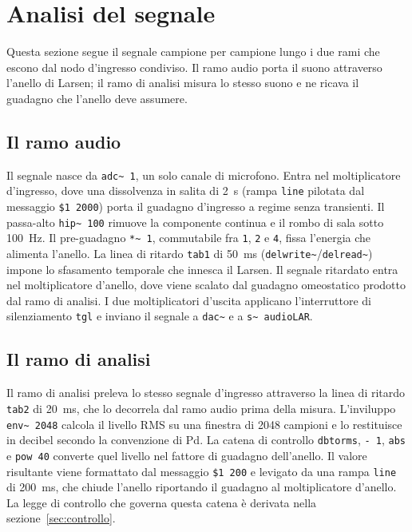 \documentclass[11pt,a4paper]{article}
\begin{document}
\section{Analisi del segnale}\label{sec:segnale}
Questa sezione segue il segnale campione per campione lungo i due rami che escono dal nodo d'ingresso condiviso.
Il ramo audio porta il suono attraverso l'anello di Larsen; il ramo di analisi misura lo stesso suono e ne ricava il guadagno che l'anello deve assumere.

\subsection{Il ramo audio}
Il segnale nasce da \texttt{adc\textasciitilde{} 1}, un solo canale di microfono.
Entra nel moltiplicatore d'ingresso, dove una dissolvenza in salita di \SI{2}{\second} (rampa \texttt{line} pilotata dal messaggio \texttt{\$1 2000}) porta il guadagno d'ingresso a regime senza transienti.
Il passa-alto \texttt{hip\textasciitilde{} 100} rimuove la componente continua e il rombo di sala sotto \SI{100}{\hertz}.
Il pre-guadagno \texttt{*\textasciitilde{} 1}, commutabile fra \texttt{1}, \texttt{2} e \texttt{4}, fissa l'energia che alimenta l'anello.
La linea di ritardo \texttt{tab1} di \SI{50}{\milli\second} (\texttt{delwrite\textasciitilde{}}/\texttt{delread\textasciitilde{}}) impone lo sfasamento temporale che innesca il Larsen.
Il segnale ritardato entra nel moltiplicatore d'anello, dove viene scalato dal guadagno omeostatico prodotto dal ramo di analisi.
I due moltiplicatori d'uscita applicano l'interruttore di silenziamento \texttt{tgl} e inviano il segnale a \texttt{dac\textasciitilde{}} e a \texttt{s\textasciitilde{} audioLAR}.

\subsection{Il ramo di analisi}
Il ramo di analisi preleva lo stesso segnale d'ingresso attraverso la linea di ritardo \texttt{tab2} di \SI{20}{\milli\second}, che lo decorrela dal ramo audio prima della misura.
L'inviluppo \texttt{env\textasciitilde{} 2048} calcola il livello RMS su una finestra di 2048 campioni e lo restituisce in decibel secondo la convenzione di Pd.
La catena di controllo \texttt{dbtorms}, \texttt{- 1}, \texttt{abs} e \texttt{pow 40} converte quel livello nel fattore di guadagno dell'anello.
Il valore risultante viene formattato dal messaggio \texttt{\$1 200} e levigato da una rampa \texttt{line} di \SI{200}{\milli\second}, che chiude l'anello riportando il guadagno al moltiplicatore d'anello.
La legge di controllo che governa questa catena è derivata nella sezione~\ref{sec:controllo}.
\end{document}

